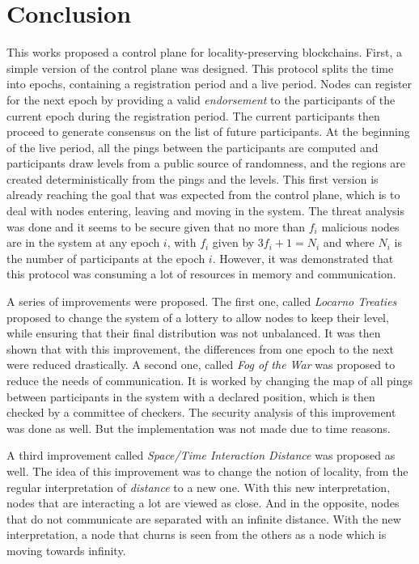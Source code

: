 \documentclass[a4paper,11pt,oneside]{report}
\begin{document}
\chapter{Conclusion} \label{chap:Conclusion} %


This works proposed a control plane for locality-preserving blockchains. First,
a simple version of the control plane was designed. This protocol splits the
time into epochs, containing a registration period and a live period. Nodes can
register for the next epoch by providing a valid \textit{endorsement} to the
participants of the current epoch during the registration period. The current
participants then proceed to generate consensus on the list of future
participants. At the beginning of the live period, all the pings between the
participants are computed and participants draw levels from a public source of
randomness, and the regions are created deterministically from the pings and
the levels. This first version is already reaching the goal that was expected
from the control plane, which is to deal with nodes entering, leaving and
moving in the system.  The threat analysis was done and it seems to be secure
given that no more than $f_i$ malicious nodes are in the system at any epoch
$i$, with $f_i$ given by $3f_i+1=N_i$ and where $N_i$ is the number of
participants at the epoch $i$.  However, it was demonstrated that this protocol
was consuming a lot of resources in memory and communication. 

A series of improvements were proposed. The first one, called \textit{Locarno
Treaties} proposed to change the system of a lottery to allow nodes to keep
their level, while ensuring that their final distribution was not unbalanced.
It was then shown that with this improvement, the differences from one epoch to
the next were reduced drastically. A second one, called \textit{Fog of the War}
was proposed to reduce the needs of communication. It is worked by changing the
map of all pings between participants in the system with a declared position,
which is then checked by a committee of checkers. The security analysis of this
improvement was done as well. But the implementation was not made due to time
reasons. 

A third improvement called \textit{Space/Time Interaction Distance} was
proposed as well. The idea of this improvement was to change the notion of
locality, from the regular interpretation of \textit{distance} to a new one.
With this new interpretation, nodes that are interacting a lot are viewed as
close. And in the opposite, nodes that do not communicate are separated with an
infinite distance. With the new interpretation, a node that churns is seen from
the others as a node which is moving towards infinity.  
\end{document}
